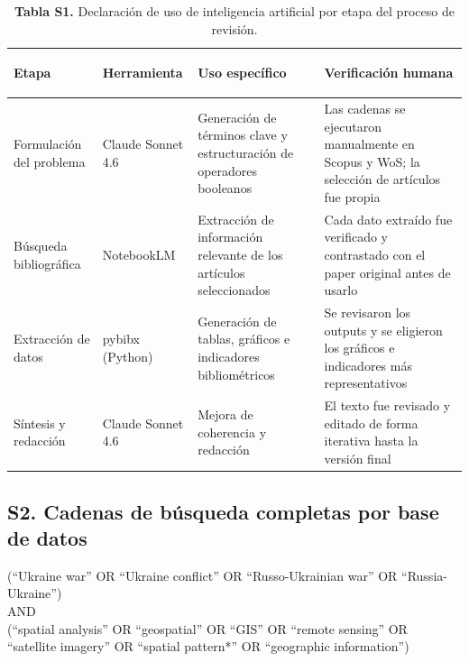 \documentclass[12pt, a4paper]{article}
\begin{document}
\begin{table}[H]
\centering
\footnotesize
\renewcommand{\arraystretch}{1.15}
\begin{tabularx}{\textwidth}{>{\bfseries\raggedright\arraybackslash}p{2.8cm} >{\raggedright\arraybackslash}p{2.4cm} >{\raggedright\arraybackslash}X >{\raggedright\arraybackslash}p{3.2cm}}
\rowcolor{tableheader}
{\color{white}\bfseries Etapa} & {\color{white}\bfseries Herramienta} & {\color{white}\bfseries Uso específico} & {\color{white}\bfseries Verificación humana} \\
\midrule
Formulación del problema & Claude Sonnet 4.6 & Generación de términos clave y estructuración de operadores booleanos & Las cadenas se ejecutaron manualmente en Scopus y WoS; la selección de artículos fue propia \\
\rowcolor{tablerow}
Búsqueda bibliográfica & NotebookLM & Extracción de información relevante de los artículos seleccionados & Cada dato extraído fue verificado y contrastado con el paper original antes de usarlo \\
Extracción de datos & pybibx (Python) & Generación de tablas, gráficos e indicadores bibliométricos & Se revisaron los outputs y se eligieron los gráficos e indicadores más representativos \\
\rowcolor{tablerow}
Síntesis y redacción & Claude Sonnet 4.6 & Mejora de coherencia y redacción & El texto fue revisado y editado de forma iterativa hasta la versión final \\
\bottomrule
\end{tabularx}
\caption*{\textbf{Tabla S1.} Declaración de uso de inteligencia artificial por etapa del proceso de revisión.}
\end{table}

\subsection*{S2. Cadenas de búsqueda completas por base de datos}

\begin{tcolorbox}[colback=lightbg, colframe=accent, arc=3pt, boxrule=0.6pt,
    left=8pt, right=8pt, top=6pt, bottom=6pt,
    title={\small\bfseries Cadena A — Scopus y WoS (1 de mayo de 2026)},
    coltitle=primary, fonttitle=\small\bfseries]
\small\ttfamily
(``Ukraine war'' OR ``Ukraine conflict'' OR ``Russo-Ukrainian war'' OR ``Russia-Ukraine'')\\
AND\\
(``spatial analysis'' OR ``geospatial'' OR ``GIS'' OR ``remote sensing'' OR\\
``satellite imagery'' OR ``spatial pattern*'' OR ``geographic information'')
\end{tcolorbox}
\end{document}

